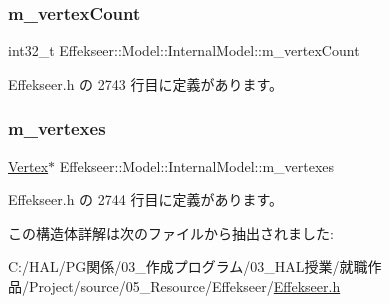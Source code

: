 \subsubsection{\texorpdfstring{m\+\_\+vertex\+Count}{m\_vertexCount}}
{\footnotesize\ttfamily int32\+\_\+t Effekseer\+::\+Model\+::\+Internal\+Model\+::m\+\_\+vertex\+Count}



 Effekseer.\+h の 2743 行目に定義があります。

\mbox{\label{struct_effekseer_1_1_model_1_1_internal_model_a8a41ac246ef524cf4aa0197b2ce1b449}} 
\subsubsection{\texorpdfstring{m\+\_\+vertexes}{m\_vertexes}}
{\footnotesize\ttfamily \mbox{\hyperlink{struct_effekseer_1_1_model_1_1_vertex}{Vertex}}$\ast$ Effekseer\+::\+Model\+::\+Internal\+Model\+::m\+\_\+vertexes}



 Effekseer.\+h の 2744 行目に定義があります。



この構造体詳解は次のファイルから抽出されました\+:\begin{DoxyCompactItemize}
\item 
C\+:/\+H\+A\+L/\+P\+G関係/03\+\_\+作成プログラム/03\+\_\+\+H\+A\+L授業/就職作品/\+Project/source/05\+\_\+\+Resource/\+Effekseer/\mbox{\hyperlink{_effekseer_8h}{Effekseer.\+h}}\end{DoxyCompactItemize}
